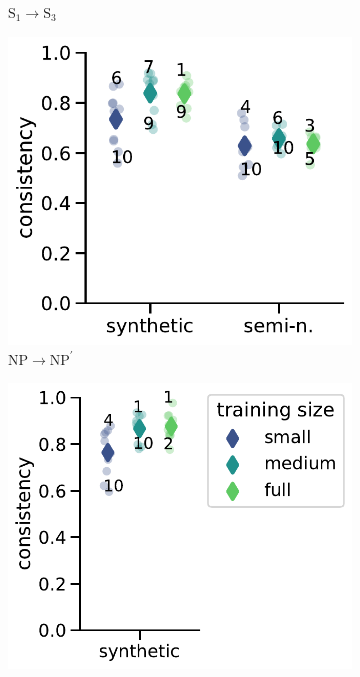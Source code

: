 \begin{figure}[!h]
\begin{subfigure}[b]{0.45\columnwidth}
        \caption{$\text{S}_1 \rightarrow \text{S}_3$}
        \label{fig:systematicity_sconj_s3}
    \end{subfigure}
    \begin{subfigure}[b]{0.45\columnwidth}
        \includegraphics[width=\columnwidth]{figures/systematicity/np.pdf}
        \caption{$\text{NP} \rightarrow \text{NP}^\prime$}
        \label{fig:systematicity_snpvp_np}
    \end{subfigure}
    \begin{subfigure}[b]{0.49\columnwidth}
        \includegraphics[width=\columnwidth]{figures/systematicity/vp.pdf}

\end{subfigure}
\end{figure}
